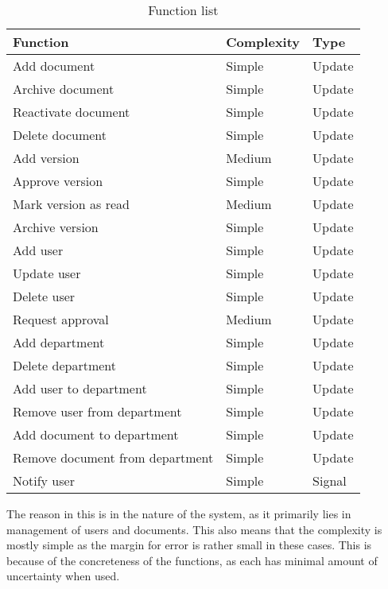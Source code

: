 
\begin{table}[H]
\centering
\begin{tabular}{lll}
	\hline
	Function						& Complexity & Type    \\
	\hline
	Add document					& Simple     & Update  \\
	Archive document				& Simple     & Update  \\
	Reactivate document				& Simple     & Update  \\  %
	Delete document					& Simple     & Update  \\
	Add version						& Medium	 & Update  \\
	Approve version					& Simple     & Update  \\
	Mark version as read			& Medium     & Update  \\ %
	Archive version					& Simple     & Update  \\
	Add user						& Simple     & Update  \\
	Update user						& Simple     & Update  \\
	Delete user						& Simple     & Update  \\
	Request approval				& Medium     & Update  \\
	Add department					& Simple     & Update  \\
	Delete department				& Simple	 & Update  \\
	Add user to department			& Simple     & Update  \\
	Remove user from department		& Simple     & Update  \\
	Add document to department		& Simple     & Update  \\
	Remove document from department & Simple     & Update  \\
	Notify user						& Simple	 & Signal  \\
	\hline
\end{tabular}
\caption{Function list}
\end{table}

The reason in this is in the nature of the system, as it primarily lies in management of users and documents.
This also means that the complexity is mostly simple as the margin for error is rather small in these cases.
This is because of the concreteness of the functions, as each has minimal amount of uncertainty when used.

